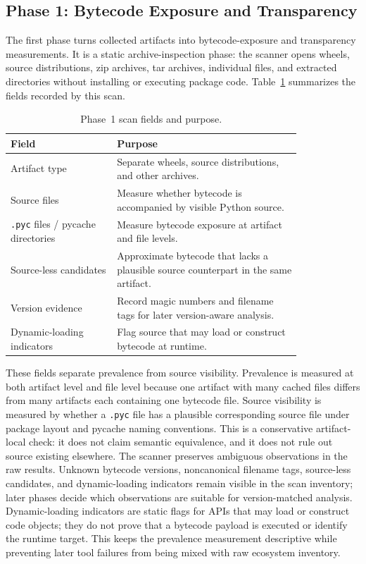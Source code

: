 \subsection{Phase 1: Bytecode Exposure and Transparency}\label{sec:method:extract}

The first phase turns collected artifacts into bytecode-exposure and transparency measurements.  It is a static archive-inspection phase: the scanner opens wheels, source distributions, zip archives, tar archives, individual files, and extracted directories without installing or executing package code.  Table~\ref{tab:phase1-scan-fields} summarizes the fields recorded by this scan.

\begin{table}[htp]
  \centering
  \caption{Phase~1 scan fields and purpose.}
  \label{tab:phase1-scan-fields}
  \begin{tabular}{p{0.30\linewidth}p{0.52\linewidth}}
    \toprule
    Field & Purpose \\
    \midrule
    Artifact type & Separate wheels, source distributions, and other archives. \\
    Source files & Measure whether bytecode is accompanied by visible Python source. \\
    \texttt{.pyc} files / pycache directories & Measure bytecode exposure at artifact and file levels. \\
    Source-less candidates & Approximate bytecode that lacks a plausible source counterpart in the same artifact. \\
    Version evidence & Record magic numbers and filename tags for later version-aware analysis. \\
    Dynamic-loading indicators & Flag source that may load or construct bytecode at runtime. \\
    \bottomrule
  \end{tabular}
\end{table}

These fields separate prevalence from source visibility.  Prevalence is measured at both artifact level and file level because one artifact with many cached files differs from many artifacts each containing one bytecode file.  Source visibility is measured by whether a \texttt{.pyc} file has a plausible corresponding source file under package layout and pycache naming conventions.  This is a conservative artifact-local check: it does not claim semantic equivalence, and it does not rule out source existing elsewhere.
%
The scanner preserves ambiguous observations in the raw results.  Unknown bytecode versions, noncanonical filename tags, source-less candidates, and dynamic-loading indicators remain visible in the scan inventory; later phases decide which observations are suitable for version-matched analysis.  Dynamic-loading indicators are static flags for APIs that may load or construct code objects; they do not prove that a bytecode payload is executed or identify the runtime target.  This keeps the prevalence measurement descriptive while preventing later tool failures from being mixed with raw ecosystem inventory.

